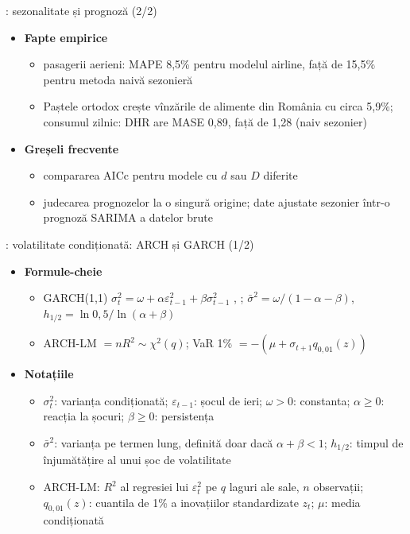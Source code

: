 \begin{frame}{: sezonalitate și prognoză (2/2)}
\itemsize{\footnotesize}
\begin{itemize}
    \item \textbf{Fapte empirice}
    \begin{itemize}
        \item pasagerii aerieni: MAPE 8{,}5\% pentru modelul airline, față de 15{,}5\% pentru metoda naivă sezonieră
        \item Paștele ortodox crește vînzările de alimente din România cu circa 5{,}9\%; consumul zilnic: DHR are MASE 0{,}89, față de 1{,}28 (naiv sezonier)
    \end{itemize}
    \item \textbf{Greșeli frecvente}
    \begin{itemize}
        \item compararea AICc pentru modele cu $d$ sau $D$ diferite
        \item judecarea prognozelor la o singură origine; date ajustate sezonier într-o prognoză SARIMA a datelor brute
    \end{itemize}
\end{itemize}
\end{frame}

\begin{frame}{: volatilitate condiționată: ARCH și GARCH (1/2)}
\itemsize{\footnotesize}
\begin{itemize}
    \item \textbf{Formule-cheie}
    \begin{itemize}
        \item GARCH(1,1) $\sigma_t^2 = \omega + \alpha\varepsilon_{t-1}^2 + \beta\sigma_{t-1}^2$ , ; $\bar\sigma^2 = \omega/(1 - \alpha - \beta)$, $h_{1/2} = \ln 0{,}5/\ln(\alpha + \beta)$
        \item ARCH-LM $= nR^2 \sim \chi^2(q)$; VaR 1\% $= -(\mu + \sigma_{t+1}q_{0{,}01}(z))$
    \end{itemize}
    \item \textbf{Notațiile}
    \begin{itemize}
        \item $\sigma_t^2$: varianța condiționată; $\varepsilon_{t-1}$: șocul de ieri; $\omega > 0$: constanta; $\alpha \ge 0$: reacția la șocuri; $\beta \ge 0$: persistența
        \item $\bar\sigma^2$: varianța pe termen lung, definită doar dacă $\alpha + \beta < 1$; $h_{1/2}$: timpul de înjumătățire al unui șoc de volatilitate
        \item ARCH-LM: $R^2$ al regresiei lui $\varepsilon_t^2$ pe $q$ laguri ale sale, $n$ observații; $q_{0,01}(z)$: cuantila de 1\% a inovațiilor standardizate $z_t$; $\mu$: media condiționată
    \end{itemize}
\end{itemize}
\end{frame}

